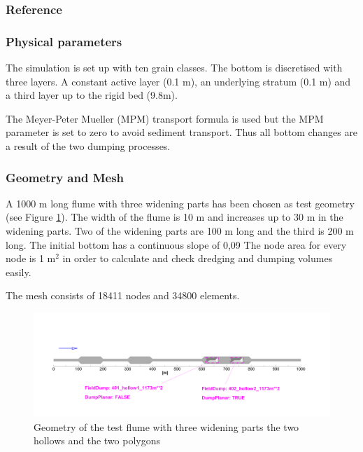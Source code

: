 %
%
\subsubsection{Reference}
%

%
%
\subsubsection{Physical parameters}
%
The simulation is set up with ten grain classes. 
The bottom is discretised with three layers. A constant active layer (0.1 m), an underlying stratum (0.1 m) and a third layer up to the rigid bed (9.8m).  

The Meyer-Peter Mueller (MPM) transport formula is used but the MPM parameter is set to zero to avoid sediment transport. Thus all bottom changes are a result of the two dumping processes. 
%
%
\subsubsection{Geometry and Mesh}
%
A 1000 m long flume with three widening parts has been chosen as test geometry (see Figure \ref{ini}).
The width of the flume is 10 m and increases up to 30 m in the widening parts. 
Two of the widening parts are 100 m long and the third is 200 m long. 
The initial bottom has a continuous slope of 0,09 %
The node area for every node is 1 m$^2$ in order to calculate and check dredging and dumping volumes easily.

The mesh consists of 18411 nodes and 34800 elements.

\begin{figure} [!h]
\centering
\includegraphics[scale=0.14]{../img/result000.png}
 \caption{Geometry of the test flume with three widening parts the two hollows and the two polygons}\label{ini}
\end{figure}


